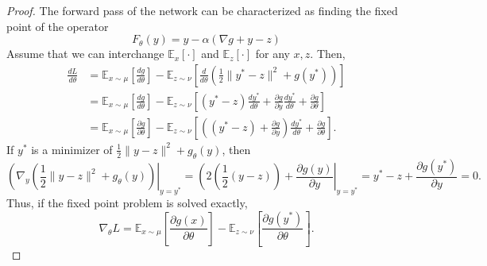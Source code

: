 \documentclass[10pt,a4paper]{amsart}
\begin{document}
\begin{proof}
The forward pass of the network can be characterized as finding the fixed point of the operator
\begin{equation}
F_{\theta}(y) = y - \alpha(\nabla g + y - z) 
\end{equation}
Assume that we can interchange $\mathbb{E}_{x}[\cdot]$ and $\mathbb{E}_{z}[\cdot]$ for any $x,z$. Then,
\begin{align}
\frac{d L}{d \theta} &= \mathbb{E}_{x \sim \mu}\left[\frac{d g}{d \theta}\right] - \mathbb{E}_{z \sim \nu}\left[\frac{d}{d \theta}(\frac{1}{2}\|y^* - z\|^2 + g(y^*))\right] \\
&=  \mathbb{E}_{x \sim \mu}\left[\frac{d g}{d \theta}\right] - \mathbb{E}_{z \sim \nu}\left[(y^* - z)\frac{d y^*}{d \theta} + \frac{ \partial g }{\partial y}\frac{d y^*}{d \theta} + \frac{\partial g}{\partial \theta}\right] \\
&= \mathbb{E}_{x \sim \mu}\left[\frac{\partial g}{\partial \theta}\right] - \mathbb{E}_{z \sim \nu}\left[\left((y^* - z) + \frac{ \partial g }{\partial y}\right)\frac{d y^*}{d \theta} + \frac{\partial g}{\partial \theta}\right].
\end{align}
If $y^*$ is a minimizer of $\frac{1}{2}\|y-z\|^2 + g_{\theta}(y)$, then
\begin{equation*}
\left( \nabla_{y}\left(\frac{1}{2}\|y-z\|^2 + g_{\theta}(y)\right)\right|_{y=y^*} = \left(2(\frac{1}{2}(y-z)) + \frac{\partial g(y)}{\partial y}\right|_{y=y^*} = y^* - z + \frac{\partial g(y^*)}{\partial y} = 0.
\end{equation*}
Thus, if the fixed point problem is solved exactly,
\begin{equation}
\nabla_{\theta}L = \mathbb{E}_{x \sim \mu}\left[\frac{\partial g(x)}{\partial \theta}\right] - \mathbb{E}_{z \sim \nu}\left[\frac{\partial g(y^*)}{\partial \theta}\right].
\end{equation}
\end{proof}
\end{document}
